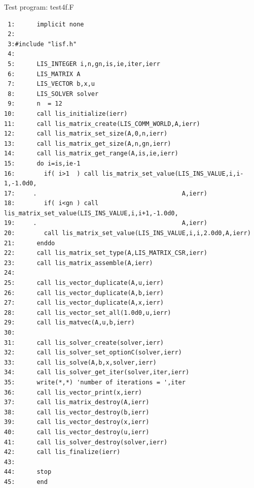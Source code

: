 \documentclass[a4paper]{article}
\begin{document}
\begin{itembox}[l]{Test program: test4f.F}
{\small
\begin{verbatim}
 1:      implicit none
 2:      
 3:#include "lisf.h"
 4:
 5:      LIS_INTEGER i,n,gn,is,ie,iter,ierr
 6:      LIS_MATRIX A
 7:      LIS_VECTOR b,x,u
 8:      LIS_SOLVER solver
 9:      n  = 12
10:      call lis_initialize(ierr)
11:      call lis_matrix_create(LIS_COMM_WORLD,A,ierr)
12:      call lis_matrix_set_size(A,0,n,ierr)
13:      call lis_matrix_get_size(A,n,gn,ierr)
14:      call lis_matrix_get_range(A,is,ie,ierr)
15:      do i=is,ie-1
16:        if( i>1  ) call lis_matrix_set_value(LIS_INS_VALUE,i,i-1,-1.0d0,
17:     .                                        A,ierr)
18:        if( i<gn ) call lis_matrix_set_value(LIS_INS_VALUE,i,i+1,-1.0d0,
19:     .                                        A,ierr)
20:        call lis_matrix_set_value(LIS_INS_VALUE,i,i,2.0d0,A,ierr)
21:      enddo
22:      call lis_matrix_set_type(A,LIS_MATRIX_CSR,ierr)
23:      call lis_matrix_assemble(A,ierr)
24:
25:      call lis_vector_duplicate(A,u,ierr)
26:      call lis_vector_duplicate(A,b,ierr)
27:      call lis_vector_duplicate(A,x,ierr)
28:      call lis_vector_set_all(1.0d0,u,ierr)
29:      call lis_matvec(A,u,b,ierr)
30:
31:      call lis_solver_create(solver,ierr)
32:      call lis_solver_set_optionC(solver,ierr)
33:      call lis_solve(A,b,x,solver,ierr)
34:      call lis_solver_get_iter(solver,iter,ierr)
35:      write(*,*) 'number of iterations = ',iter
36:      call lis_vector_print(x,ierr)
37:      call lis_matrix_destroy(A,ierr)
38:      call lis_vector_destroy(b,ierr)
39:      call lis_vector_destroy(x,ierr)
40:      call lis_vector_destroy(u,ierr)
41:      call lis_solver_destroy(solver,ierr)
42:      call lis_finalize(ierr)
43:
44:      stop
45:      end
\end{verbatim}
}
\end{itembox}

\newpage
\end{document}
